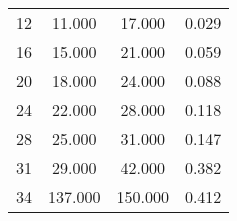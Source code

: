 % 
\begin{tabular}{cccc}
  \hline
  \hline
12 & 11.000 & 17.000 & 0.029 \\ 
  16 & 15.000 & 21.000 & 0.059 \\ 
  20 & 18.000 & 24.000 & 0.088 \\ 
  24 & 22.000 & 28.000 & 0.118 \\ 
  28 & 25.000 & 31.000 & 0.147 \\ 
  31 & 29.000 & 42.000 & 0.382 \\ 
  34 & 137.000 & 150.000 & 0.412 \\ 
   \hline
\end{tabular}
